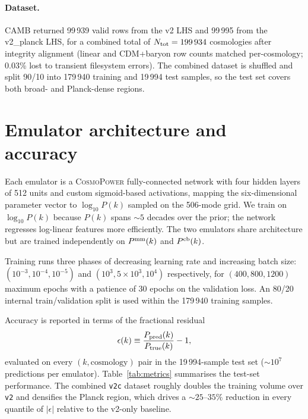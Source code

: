 \documentclass[11pt]{article}
\begin{document}
\paragraph{Dataset.} CAMB returned 99\,939 valid rows from the v2
LHS and 99\,995 from the v2\_planck LHS, for a combined total of
$N_{\rm tot} = 199\,934$ cosmologies after integrity alignment
(linear and CDM+baryon row counts matched per-cosmology; 0.03\% lost
to transient filesystem errors). The combined dataset is shuffled
and split 90/10 into 179\,940 training and 19\,994 test samples, so
the test set covers both broad- and Planck-dense regions.

\section{Emulator architecture and accuracy}
\label{sec:results}

Each emulator is a \textsc{CosmoPower} fully-connected network with
four hidden layers of 512 units and custom sigmoid-based activations,
mapping the six-dimensional parameter vector to $\log_{10} P(k)$
sampled on the 506-mode grid. We train on $\log_{10} P(k)$ because
$P(k)$ spans $\sim 5$ decades over the prior; the network regresses
log-linear features more efficiently. The two emulators share
architecture but are trained independently on $P^{\rm mm}(k)$ and
$P^{\rm cb}(k)$.

Training runs three phases of decreasing learning rate and increasing
batch size: $(10^{-3}, 10^{-4}, 10^{-5})$ and
$(10^3, 5 \times 10^3, 10^4)$ respectively, for
$(400, 800, 1200)$ maximum epochs with a patience of 30 epochs on the
validation loss. An 80/20 internal train/validation split is used
within the 179\,940 training samples.

Accuracy is reported in terms of the fractional residual
\[
  \epsilon(k) \equiv \frac{P_{\rm pred}(k)}{P_{\rm true}(k)} - 1 ,
\]
evaluated on every $(k, \text{cosmology})$ pair in the 19\,994-sample
test set ($\sim 10^7$ predictions per emulator).
Table~\ref{tab:metrics} summarises the test-set performance. The
combined \texttt{v2c} dataset roughly doubles the training volume
over \texttt{v2} and densifies the Planck region, which drives a
$\sim 25$--$35\%$ reduction in every quantile of $|\epsilon|$
relative to the v2-only baseline.
\end{document}
